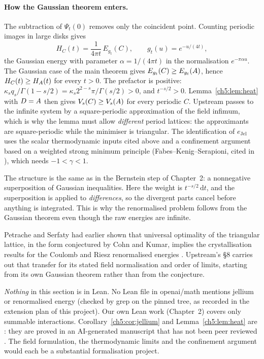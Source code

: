 \paragraph{How the Gaussian theorem enters.}
\tierL{} The subtraction of $\Psi_t(0)$ removes only the coincident point. Counting periodic images in large disks
gives \cite[\S8]{oai}
\[
H_C(t)=\frac1{4\pi t}\,E_{g_t}(C),\qquad g_t(u)=e^{-u/(4t)},
\]
the Gaussian energy with parameter $\alpha=1/(4\pi t)$ in the normalisation $e^{-\pi\alpha u}$. The Gaussian case of
the main theorem gives $E_{g_t}(C)\ge E_{g_t}(A)$, hence $H_C(t)\ge H_A(t)$ for every $t>0$. The prefactor is
positive: $\kappa_sq_s/\Gamma(1-s/2)=\kappa_s2^{2-s}\pi/\Gamma(s/2)>0$, and $t^{-s/2}>0$. Lemma~\ref{ch5:lem:heat} with
$D=A$ then gives $V_s(C)\ge V_s(A)$ for every periodic $C$. Upstream passes to the infinite system by a
square-periodic approximation of the field infimum, which is why the lemma must allow \emph{different} period
lattices: the approximants are square-periodic while the minimiser is triangular. The identification of
$e_{\mathrm{Jel}}$ uses the scalar thermodynamic inputs cited above and a confinement argument based on a weighted
strong minimum principle (Fabes--Kenig--Serapioni, cited in \cite[\S8]{oai}), which needs $-1<\gamma<1$.

The structure is the same as in the Bernstein step of Chapter~2: a nonnegative superposition of Gaussian
inequalities. Here the weight is $t^{-s/2}\,\mathrm{d}t$, and the superposition is applied to \emph{differences}, so
the divergent parts cancel before anything is integrated. This is why the renormalised problem follows from the
Gaussian theorem even though the raw energies are infinite.

Petrache and Serfaty had earlier shown \tierL{} that universal optimality of the triangular lattice, in the form
conjectured by Cohn and Kumar, implies the crystallisation results for the Coulomb and Riesz renormalised energies
\cite[Theorem~2]{ps}. Upstream's \S8 carries out that transfer for its stated field normalisation and order of
limits, starting from its own Gaussian theorem rather than from the conjecture.

\begin{warnbox}
\tierC{} \emph{Nothing} in this section is in Lean. No Lean file in openai/math mentions jellium or renormalised
energy (checked by grep on the pinned tree, as recorded in the extension plan of this project). Our own Lean work
(Chapter~2) covers only summable interactions. Corollary~\ref{ch5:cor:jellium} and Lemma~\ref{ch5:lem:heat} are \tierL{}:
they are proved in an AI-generated manuscript that has not been peer reviewed \cite{oai}. The field formulation,
the thermodynamic limits and the confinement argument would each be a substantial formalisation project.
\end{warnbox}

